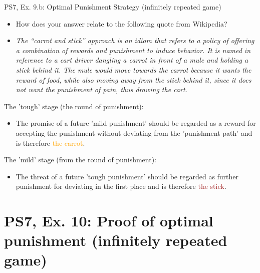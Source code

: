 \begin{frame}{PS7, Ex. 9.b: Optimal Punishment Strategy (infinitely repeated game)}
  \begin{itemize}
    \item[(b)] How does your answer relate to the following quote from Wikipedia?
    \item[] \textit{The “carrot and stick” approach is an idiom that refers to a policy of offering a combination of rewards and punishment to induce behavior. It is named in reference to a cart driver dangling a carrot in front of a mule and holding a stick behind it. The mule would move towards the carrot because it wants the reward of food, while also moving away from the stick behind it, since it does not want the punishment of pain, thus drawing the cart.}
  \end{itemize}
  \vspace{-4pt}
  \begin{multicols}{2}
    The 'tough' stage (the  round of punishment):
    \begin{itemize}
      \item The promise of a future 'mild punishment' should be regarded as a reward for accepting the punishment without deviating from the 'punishment path' and is therefore \textcolor{orange}{the carrot}.
    \end{itemize}
    \vfill\null\columnbreak
    The 'mild' stage (from the  round of punishment):
    \begin{itemize}
      \item The threat of a future 'tough punishment' should be regarded as further punishment for deviating in the first place and is therefore \textcolor{brown}{the stick}.
    \end{itemize}
    \vfill\null
  \end{multicols}
\end{frame}



\section{PS7, Ex. 10: Proof of optimal punishment (infinitely repeated game)}

